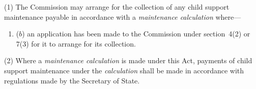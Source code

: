 \documentclass[12pt,a4paper]{article}
\begin{document}
(1) The 
Commission  %
may arrange for the collection of any child support maintenance payable in accordance with a 
\emph{maintenance calculation}  %
where—
\begin{enumerate}\item[]

($b$) an application has been made to the 
Commission  %
under section~4(2)  or 7(3)  for 
it  %
to arrange for its collection.
\end{enumerate}

(2) Where a 
\emph{maintenance calculation}  %
is made under this Act, payments of child support maintenance under the 
\emph{calculation}  %
shall be made in accordance with regulations made by the Secretary of State.
\end{document}
